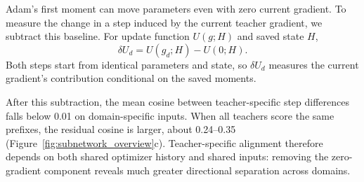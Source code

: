 Adam's first moment can move parameters even with zero current gradient. To measure the change in a step induced by the current teacher gradient, we subtract this baseline. For update function $U(g;H)$ and saved state $H$,
\begin{equation}
\delta U_d=U(g_d;H)-U(0;H).
\label{eq:history_subtracted}
\end{equation}
Both steps start from identical parameters and state, so $\delta U_d$ measures the current gradient's contribution conditional on the saved moments.

After this subtraction, the mean cosine between teacher-specific step differences falls below 0.01 on domain-specific inputs. When all teachers score the same prefixes, the residual cosine is larger, about 0.24--0.35 (Figure~\ref{fig:subnetwork_overview}c). Teacher-specific alignment therefore depends on both shared optimizer history and shared inputs: removing the zero-gradient component reveals much greater directional separation across domains.

